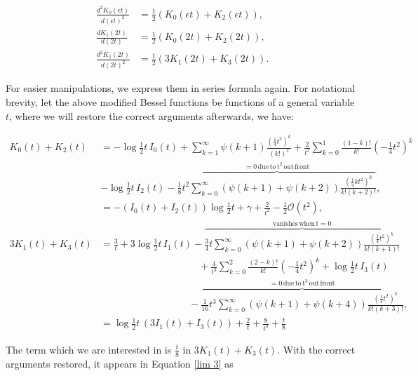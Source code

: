 \documentclass{article}
\numberwithin{equation}{section} %
\begin{document}
\begin{equation}
\begin{split}
\frac{d^2K_0(\epsilon t)}{d(\epsilon t)^2} &= \frac{1}{2}( K_0(\epsilon t) + K_2(\epsilon t)),\\
\frac{dK_1(2t)}{d(2t)} &= \frac{1}{2}(K_0(2t) + K_2(2t)),\\
\frac{d^2K_1(2t)}{d(2t)^2} &= \frac{1}{2}(3K_1(2t) + K_3(2t)). 
\end{split}
\end{equation}

\noindent For easier manipulations, we express them in series formula again. For notational brevity, let the above modified Bessel functions be functions of a general variable $t$, where we will restore the correct arguments afterwards, we have:

\begin{equation}
\begin{split}
K_0(t) + K_2(t) &= -\log \frac{1}{2}t \, I_0(t) + \sum_{k=1}^\infty \psi(k+1) \frac{(\frac{1}{4}t^2)^k}{(k!)^2} + \frac{2}{t^2}\sum_{k=0}^1 \frac{(1-k)!}{k!}(-\frac{1}{4}t^2)^k\\
& -\log\frac{1}{2}t \, I_2(t) - \overbrace{\frac{1}{8}t^2\sum_{k=0}^\infty (\psi(k+1) + \psi(k+2))\frac{(\frac{1}{4}kt^2)^k}{k!(k+2)!}}^{\mathrm{=0 \, due \, to \, t^2 \,out \, front}},\\
&= -(I_0(t) + I_2(t)) \log \frac{1}{2}t + \gamma + \frac{2}{t^2} - \frac{1}{2}  \mathcal{O}(t^2) ,\\
3K_1(t) + K_3(t) &= \frac{3}{t} + 3\log \frac{1}{2}t \, I_1(t) - \overbrace{\frac{3}{4}t \sum_{k=0}^\infty(\psi(k+1) + \psi(k+2)) \frac{(\frac{1}{4}t^2)^k}{k!(k+1)!}}^{\mathrm{vanishes \, when \, t=0}}\\
& \quad\quad\quad\quad\quad\quad\quad\quad\quad\quad + \frac{4}{t^3}\sum_{k=0}^2 \frac{(2-k)!}{k!}(-\frac{1}{4}t^2)^k + \log \frac{1}{2}t \, I_3(t) \\
& \quad\quad\quad\quad\quad\quad\quad\quad\quad-  \overbrace{\frac{1}{16}t^3 \sum_{k=0}^\infty (\psi(k+1) + \psi(k+4)) \frac{(\frac{1}{4}t^2)^k}{k!(k+3)!}}^{\mathrm{=0 \, due \, to \, t^3 \,out \, front}},\\
&=\log\frac{1}{2}t \, (3I_1(t) + I_3(t)) + \frac{2}{t} + \frac{8}{t^3} + \frac{t}{8}
\end{split}
\label{lim 31}
\end{equation}

\noindent The term which we are interested in is $\frac{t}{8}$ in $3K_1(t) + K_3(t)$. With the correct arguments restored, it appears in Equation \ref{lim 3} as 
\end{document}
